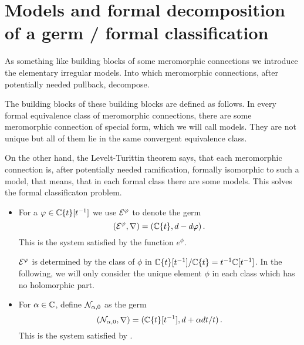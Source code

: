 \section{Models and formal decomposition of a germ / formal classification}
\begin{paracol}{2}
\switchcolumn[0]\noindent
  As something like building blocks of some meromorphic connections we introduce
  the elementary irregular models. Into which meromorphic connections, after
  potentially needed pullback, decompose.

  The building blocks of these building blocks are defined as follows.
\switchcolumn[1]\noindent
  In every formal equivalence class of meromorphic connections, there are some
  meromorphic connection of special form, which we will call models. They are
  not unique but all of them lie in the same convergent equivalence class.

  On the other hand, the Levelt-Turittin theorem says,
  that  each meromorphic connection is, after potentially needed ramification,
  formally isomorphic to such a model, that means, that in each formal class
  there are some models.
  This solves the formal classificaton problem.
\end{paracol}
\begin{defn}
  \begin{itemize}
    \item For a $\varphi\in\mathbb{C}\{t\}[t^{-1}]$ we use $\mathcal{E}^{\varphi}$ to denote the germ
      \[
        (\mathcal{E}^{\varphi},\nabla)=(\mathbb{C}\{t\},d-d\varphi)\,.
      \]
      This is the system satisfied by the function $e^\phi$.
      \begin{cor}
        $\mathcal{E}^\varphi$ is determined by the class of $\phi$ in
        $\mathbb{C}\{t\}[t^{-1}]/\mathbb{C}\{t\}=t^{-1}\mathbb{C}[t^{-1}]$. In the following, we will
        only consider the unique element $\phi$ in each class which has no
        holomorphic part.
      \end{cor}
    \item For $\alpha\in\mathbb{C}$, define $\mathcal{N}_{\alpha,0}$ as the germ
      \[
        (\mathcal{N}_{\alpha,0},\nabla)=(\mathbb{C}\{t\}[t^{-1}],d+\alpha dt/t)\,.
      \]
      This is the system satisfied by \TODO{}.
  \end{itemize}
\end{defn}
